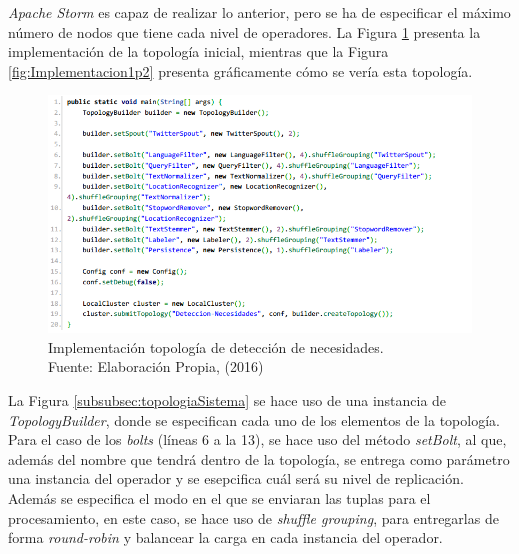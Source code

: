 \textit{Apache Storm} es capaz de realizar lo anterior, pero se ha de especificar el máximo número de nodos que tiene cada nivel de operadores. La Figura \ref{fig:Implementacion1} presenta la implementación de la topología inicial, mientras que la Figura \ref{fig:Implementacion1p2} presenta gráficamente cómo se vería esta topología.

\begin{figure}[H]
	\centering
	\captionsetup{justification=centering}
	\includegraphics[scale=0.8]{images/ImplementacionTopologia1.png}
	\caption[Implementación topología de detección de necesidades.]{Implementación topología de detección de necesidades.\\Fuente: Elaboración Propia, (2016)}
	\label{fig:Implementacion1}
\end{figure}


La Figura \ref{subsubsec:topologiaSistema} se hace uso de una instancia de \textit{TopologyBuilder}, donde se especifican cada uno de los elementos de la topología. Para el caso de los \textit{bolts} (líneas 6 a la 13), se hace uso del método \textit{setBolt}, al que, además del nombre que tendrá dentro de la topología, se entrega como parámetro una instancia del operador y se esepcifica cuál será su nivel de replicación. Además se especifica el modo en el que se enviaran las tuplas para el procesamiento, en este caso, se hace uso de \textit{shuffle grouping}, para entregarlas de forma \textit{round-robin} y balancear la carga en cada instancia del operador.

